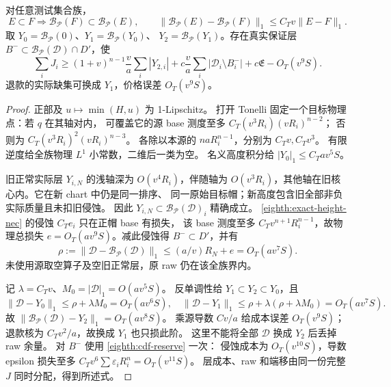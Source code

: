 \begin{lemma}[整源小算子与两次反馈]\label{eighth:exact-iteration}
对任意测试集合族，
\[
 E\subset F\Longrightarrow\mathscr B_{\mathscr P}(F)
       \subset\mathscr B_{\mathscr P}(E),\qquad
 \|\mathscr B_{\mathscr P}(E)-\mathscr B_{\mathscr P}(F)\|_1
       \le C_Tv\|E-F\|_1.
\]
取 \(Y_0=\mathscr B_{\mathscr P}(0)\)、\(Y_1=\mathscr B_{\mathscr P}(Y_0)\)、
\(Y_2=\mathscr B_{\mathscr P}(Y_1)\)。存在真实保证层
\(B^-\subset\mathscr B_{\mathscr P}(\mathscr D)\cap D'\)，使
\begin{equation}\label{eighth:exact-second-cost}
 \sum_iJ_i\ge(1+v)^{n-1}\frac va\sum_i|Y_{2,i}|
 +c\frac va\sum_i|\mathscr D_i\setminus B_i^-|
 +c\mathfrak E-O_T(v^9S).
\end{equation}
退款的实际缺集可换成 \(Y_1\)，价格误差 \(O_T(v^9S)\)。
\end{lemma}
\begin{proof}
正部及 \(u\mapsto\min(H,u)\) 为 1-Lipschitz。
打开 Tonelli 固定一个目标物理点：若 \(q\) 在其轴对内，
可覆盖它的源 base 测度至多 \(C_T(v^3R_i)(vR_i)^{n-2}\)；
否则为 \(C_T(v^3R_i)^2(vR_i)^{n-3}\)。
各除以本源的 \(naR_i^{n-1}\)，分别为 \(C_Tv,C_Tv^3\)。
有限逆度给全族物理 \(L^1\) 小常数，二维后一类为空。
名义高度积分给 \(|Y_0|_1\le C_Tav^5S\)。

旧正常实际层 \(Y_{i,N}\) 的浅轴深为 \(O(v^4R_i)\)，伴随轴为
\(O(v^3R_i)\)，其他轴在旧核心内。它在新 chart 中仍是同一排序、
同一原始目标帽；新高度包含旧全部非负实际质量且未扣旧侵蚀。
因此 \(Y_{i,N}\subset\mathscr B_{\mathscr P}(\mathscr D)_i\) 精确成立。
\eqref{eighth:exact-height-nec} 的侵蚀 \(C_Te_i\) 只在正帽 base 有损失，
该 base 测度至多 \(C_Tv^{n+1}R_i^{n-1}\)，故物理总损失
\(e=O_T(av^9S)\)。减此侵蚀得 \(B^-\subset D'\)，并有
\[
 \rho:=\|\mathscr D-\mathscr B_{\mathscr P}(\mathscr D)\|_1
 \le (a/v)R_N+e=O_T(av^7S).
\]
未使用源取空算子及空旧正常层，原 raw 仍在该全族界内。

记 \(\lambda=C_Tv\)、\(M_0=|\mathscr D|_1=O(av^5S)\)。
反单调性给 \(Y_1\subset Y_2\subset Y_0\)，且
\[
 \|\mathscr D-Y_0\|_1\le\rho+\lambda M_0=O_T(av^6S),\quad
 \|\mathscr D-Y_1\|_1\le\rho+\lambda(\rho+\lambda M_0)=O_T(av^7S).
\]
故 \(\|\mathscr B_{\mathscr P}(\mathscr D)-Y_2\|_1=O_T(av^8S)\)。
乘源导数 \(Cv/a\) 给成本误差 \(O_T(v^9S)\)；
退款核为 \(C_Tv^2/a\)，故换成 \(Y_1\) 也只损此阶。
这里不能将全部 \(\mathscr D\) 换成 \(Y_2\) 后丢掉 raw 余量。
对 \(B^-\) 使用 \eqref{eighth:cdf-reserve} 一次：
侵蚀成本为 \(O_T(v^{10}S)\)，导数 epsilon 损失至多
\(C_Tv^6\sum\varepsilon_iR_i^n=O_T(v^{11}S)\)。
层成本、raw 和端移由同一份完整 \(J\) 同时分配，得到所述式。
\end{proof}

